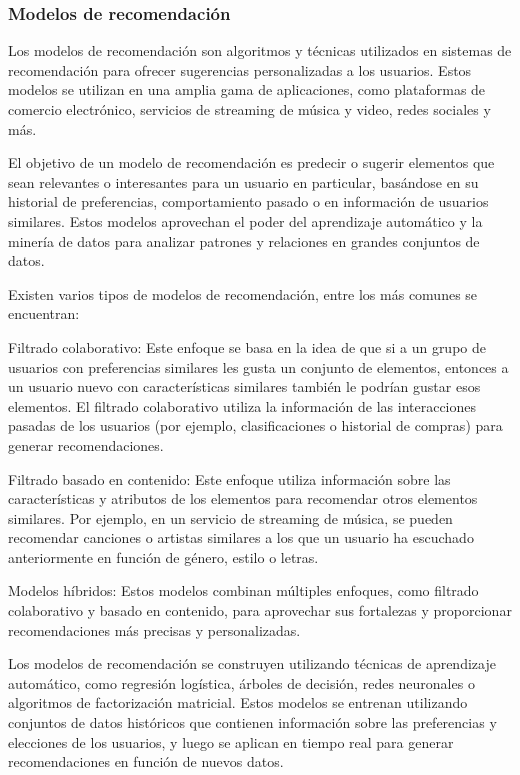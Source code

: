 \subsubsection{Modelos de recomendación}
Los modelos de recomendación son algoritmos y técnicas utilizados en sistemas de recomendación para ofrecer sugerencias personalizadas a los usuarios. Estos modelos se utilizan en una amplia gama de aplicaciones, como plataformas de comercio electrónico, servicios de streaming de música y video, redes sociales y más.

El objetivo de un modelo de recomendación es predecir o sugerir elementos que sean relevantes o interesantes para un usuario en particular, basándose en su historial de preferencias, comportamiento pasado o en información de usuarios similares. Estos modelos aprovechan el poder del aprendizaje automático y la minería de datos para analizar patrones y relaciones en grandes conjuntos de datos.

Existen varios tipos de modelos de recomendación, entre los más comunes se encuentran:

Filtrado colaborativo: Este enfoque se basa en la idea de que si a un grupo de usuarios con preferencias similares les gusta un conjunto de elementos, entonces a un usuario nuevo con características similares también le podrían gustar esos elementos. El filtrado colaborativo utiliza la información de las interacciones pasadas de los usuarios (por ejemplo, clasificaciones o historial de compras) para generar recomendaciones.

Filtrado basado en contenido: Este enfoque utiliza información sobre las características y atributos de los elementos para recomendar otros elementos similares. Por ejemplo, en un servicio de streaming de música, se pueden recomendar canciones o artistas similares a los que un usuario ha escuchado anteriormente en función de género, estilo o letras.

Modelos híbridos: Estos modelos combinan múltiples enfoques, como filtrado colaborativo y basado en contenido, para aprovechar sus fortalezas y proporcionar recomendaciones más precisas y personalizadas.

Los modelos de recomendación se construyen utilizando técnicas de aprendizaje automático, como regresión logística, árboles de decisión, redes neuronales o algoritmos de factorización matricial. Estos modelos se entrenan utilizando conjuntos de datos históricos que contienen información sobre las preferencias y elecciones de los usuarios, y luego se aplican en tiempo real para generar recomendaciones en función de nuevos datos.

